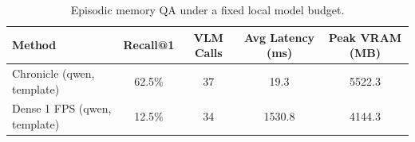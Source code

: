 \begin{table}[t]
  \centering
  \caption{Episodic memory QA under a fixed local model budget.}
  \label{tab:chronicle-vs-dense}
  \begin{tabular}{lcccc}
    \toprule
    Method & Recall@1 & VLM Calls & Avg Latency (ms) & Peak VRAM (MB) \\
    \midrule
    Chronicle (qwen, template) & 62.5\% & 37 & 19.3 & 5522.3 \\
    Dense 1 FPS (qwen, template) & 12.5\% & 34 & 1530.8 & 4144.3 \\
    \bottomrule
  \end{tabular}
\end{table}
